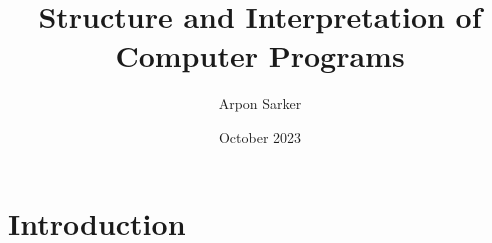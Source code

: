 \documentclass{article}
\title{Structure and Interpretation of Computer Programs}
\author{Arpon Sarker}
\date{October 2023}
\begin{document}
\maketitle

\section{Introduction}
\end{document}

